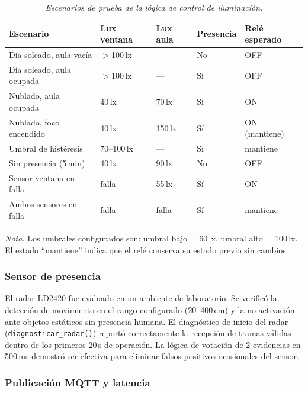\begin{table}[htbp]
  \caption{\textit{Escenarios de prueba de la lógica de control de iluminación.}}
  \label{tab:pruebas_logica}
  \centering
  \small
  \begin{tabularx}{\textwidth}{@{}p{3.5cm}p{2.5cm}p{2.5cm}Xp{2cm}@{}}
    \toprule
    \textbf{Escenario} & \textbf{Lux ventana} & \textbf{Lux aula} & \textbf{Presencia} & \textbf{Relé esperado} \\
    \midrule
    Día soleado, aula vacía     & $>$100\,lx & —      & No & OFF \\
    Día soleado, aula ocupada   & $>$100\,lx & —      & Sí & OFF \\
    Nublado, aula ocupada       & 40\,lx    & 70\,lx & Sí & ON  \\
    Nublado, foco encendido     & 40\,lx    & 150\,lx & Sí & ON (mantiene) \\
    Umbral de histéresis        & 70–100\,lx & —     & Sí & mantiene \\
    Sin presencia (5\,min)      & 40\,lx    & 90\,lx & No & OFF \\
    Sensor ventana en falla     & falla     & 55\,lx & Sí & ON  \\
    Ambos sensores en falla     & falla     & falla  & Sí & mantiene \\
    \bottomrule
  \end{tabularx}
  \vspace{4pt}

  \noindent\textit{Nota.} Los umbrales configurados son: umbral bajo = 60\,lx,
  umbral alto = 100\,lx. El estado ``mantiene'' indica que el relé conserva
  su estado previo sin cambios.
\end{table}

\subsubsection{Sensor de presencia}

El radar LD2420 fue evaluado en un ambiente de laboratorio. Se verificó la
detección de movimiento en el rango configurado (20–400\,cm) y la no activación
ante objetos estáticos sin presencia humana. El diagnóstico de inicio del radar
(\texttt{diagnosticar\_radar()}) reportó correctamente la recepción de tramas
válidas dentro de los primeros 20\,s de operación. La lógica de votación de 2
evidencias en 500\,ms demostró ser efectiva para eliminar falsos positivos
ocasionales del sensor.

\subsubsection{Publicación MQTT y latencia}


